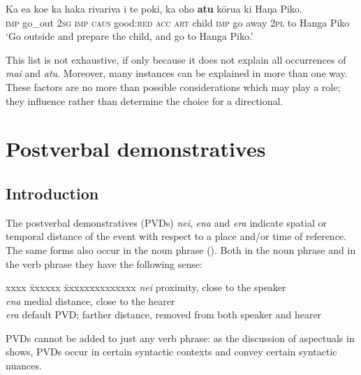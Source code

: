 \ea\label{ex:7.153}
\gll Ka e{\ꞌ}a koe ka haka rivariva i te poki, ka oho \textbf{atu} kōrua ki Haŋa Piko. \\
\textsc{imp} go\_out \textsc{2sg} \textsc{imp} \textsc{caus} good:\textsc{red} \textsc{acc} \textsc{art} child \textsc{imp} go away \textsc{2pl} to Hanga Piko \\

\glt 
‘Go outside and prepare the child, and go to Hanga Piko.’ \textstyleExampleref{[R210.036]} 
\z

This list is not exhaustive, if only because it does not explain all occurrences of \textit{mai} and \textit{atu}. Moreover, many instances can be explained in more than one way. These factors are no more than possible considerations which may play a role; they influence rather than determine the choice for a directional.
\section{Postverbal demonstratives}\label{sec:7.6}
\subsection{Introduction}\label{sec:7.6.1}

The postverbal demonstratives (PVDs) \textit{nei}, \textit{ena} and \textit{era} indicate spatial or temporal distance of the event with respect to a place and/or time of reference. The same forms also occur in the noun phrase (). Both in the noun phrase and in the verb phrase they have the following sense:

\begin{tabbing}
xxxx \= xxxxxx \= xxxxxxxxxxxxxx\kill
\> \textit{nei}\>  proximity, close to the speaker\\
\> \textit{ena} \> medial distance, close to the hearer\\
\> \textit{era} \> default PVD; farther distance, removed from both speaker and hearer
\end{tabbing}

PVDs cannot be added to just any verb phrase: as the discussion of aspectuals in  shows, PVDs occur in certain syntactic contexts and convey certain syntactic nuances.

